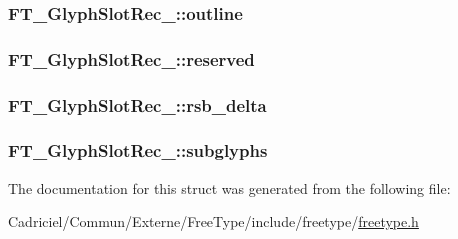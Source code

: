 \hypertarget{struct_f_t___glyph_slot_rec___a8e46dd5d808079bdcba68056d6476d8d}{
\subsubsection[{outline}]{ F\-T\-\_\-\-Glyph\-Slot\-Rec\-\_\-\-::outline}}\label{struct_f_t___glyph_slot_rec___a8e46dd5d808079bdcba68056d6476d8d}
\hypertarget{struct_f_t___glyph_slot_rec___ae829996584939557dfe46c4e4f2b28a8}{
\subsubsection[{reserved}]{ F\-T\-\_\-\-Glyph\-Slot\-Rec\-\_\-\-::reserved}}\label{struct_f_t___glyph_slot_rec___ae829996584939557dfe46c4e4f2b28a8}
\hypertarget{struct_f_t___glyph_slot_rec___a2ca5f5e7b92df3aee4584949fa6a2a1c}{
\subsubsection[{rsb\-\_\-delta}]{ F\-T\-\_\-\-Glyph\-Slot\-Rec\-\_\-\-::rsb\-\_\-delta}}\label{struct_f_t___glyph_slot_rec___a2ca5f5e7b92df3aee4584949fa6a2a1c}
\hypertarget{struct_f_t___glyph_slot_rec___a295f5a3108399c4c0703e6ee2f88cc67}{
\subsubsection[{subglyphs}]{ F\-T\-\_\-\-Glyph\-Slot\-Rec\-\_\-\-::subglyphs}}\label{struct_f_t___glyph_slot_rec___a295f5a3108399c4c0703e6ee2f88cc67}


The documentation for this struct was generated from the following file\-:\begin{DoxyCompactItemize}
\item 
Cadriciel/\-Commun/\-Externe/\-Free\-Type/include/freetype/\hyperlink{freetype_8h}{freetype.\-h}\end{DoxyCompactItemize}
